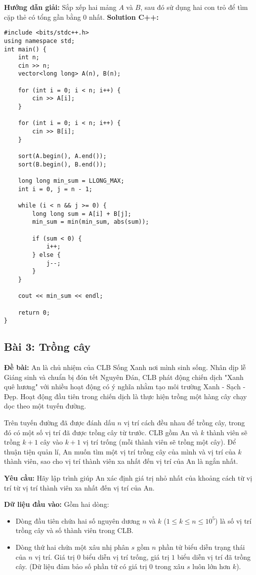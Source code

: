 \documentclass[12pt]{scrartcl}  %
\begin{document}
\textbf{Hướng dẫn giải:}
Sắp xếp hai mảng $A$ và $B$, sau đó sử dụng hai con trỏ để tìm cặp thẻ có tổng gần bằng $0$ nhất.
\textbf{Solution C++:}
\begin{lstlisting}
#include <bits/stdc++.h>
using namespace std;
int main() {
    int n;
    cin >> n;
    vector<long long> A(n), B(n);
    
    for (int i = 0; i < n; i++) {
        cin >> A[i];
    }
    
    for (int i = 0; i < n; i++) {
        cin >> B[i];
    }
    
    sort(A.begin(), A.end());
    sort(B.begin(), B.end());
    
    long long min_sum = LLONG_MAX;
    int i = 0, j = n - 1;
    
    while (i < n && j >= 0) {
        long long sum = A[i] + B[j];
        min_sum = min(min_sum, abs(sum));
        
        if (sum < 0) {
            i++;
        } else {
            j--;
        }
    }
    
    cout << min_sum << endl;
    
    return 0;
}
\end{lstlisting}

\subsection{Bài 3: Trồng cây}

\textbf{Đề bài:}
An là chủ nhiệm của CLB Sống Xanh nơi mình sinh sống. Nhân dịp lễ Giáng sinh và chuẩn bị đón tết Nguyên Đán, CLB phát động chiến dịch "Xanh quê hương"
với nhiều hoạt động có ý nghĩa nhằm tạo môi trường Xanh - Sạch - Đẹp. Hoạt động đầu tiên trong chiến dịch là thực hiện trồng một hàng cây chạy dọc theo 
một tuyến đường. 

Trên tuyến đường đã được đánh dấu $n$ vị trí cách đều nhau để trồng cây, trong đó có một số vị trí đã được trồng cây từ trước. CLB gồm An và $k$ thành viên sẽ trồng $k + 1$ 
cây vào $k + 1$ vị trí trống (mỗi thành viên sẽ trồng một cây). Để thuận tiện quản lí, An muốn tìm một vị trí trồng cây của mình và vị trí của $k$ thành viên, sao cho vị trí thành viên xa nhất đến vị trí của An là ngắn nhất.

\textbf{Yêu cầu:}
Hãy lập trình giúp An xác định giá trị nhỏ nhất của khoảng cách từ vị trí từ vị trí thành viên xa nhất đến vị trí của An.

\textbf{Dữ liệu đầu vào:}
Gồm hai dòng:
\begin{itemize}
    \item Dòng đầu tiên chứa hai số nguyên dương $n$ và $k$ ($1 \leq k \leq n \leq 10^5$) là số vị trí trồng cây và số thành viên trong CLB.
    \item Dòng thứ hai chứa một xâu nhị phân $s$ gồm $n$ phần tử biểu diễn trạng thái của $n$ vị trí. Giá trị $0$ biểu diễn vị trí trống, giá trị $1$ biểu diễn vị trí đã trồng cây. (Dữ liệu đảm bảo số phần tử có giá trị $0$ trong xâu $s$ luôn lớn hơn $k$).
\end{itemize}
\end{document}
